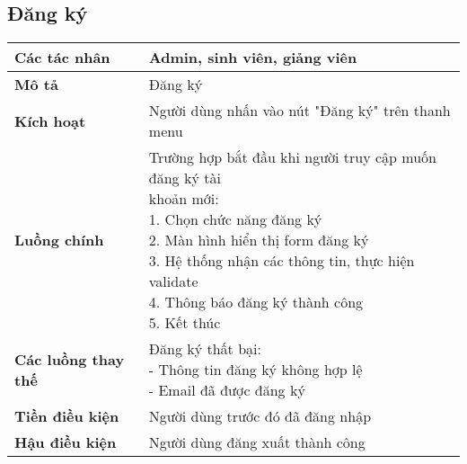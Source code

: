 \subsection*{Đăng ký}
	\begin{tabular}{|l|p{}|}
		\hline
		\textbf{Các tác nhân}       & Admin, sinh viên, giảng viên                                        \\
		\hline
		\textbf{Mô tả}              & Đăng ký                                                             \\
		\hline
		\textbf{Kích hoạt}          & Người dùng nhấn vào nút "Đăng ký" trên thanh menu                   \\
		\hline
		\textbf{Luồng chính}         & \makecell[l]{Trường hợp bắt đầu khi người truy cập muốn đăng ký tài \\khoản mới: \\ 1. Chọn chức năng đăng ký \\ 2. Màn hình hiển thị form đăng ký \\ 3. Hệ thống nhận các thông tin, thực hiện validate \\ 4. Thông báo đăng ký thành công \\ 5. Kết thúc} \\
		\hline
		\textbf{Các luồng thay thế} & \makecell[l]{Đăng ký thất bại:                                      \\ - Thông tin đăng ký không hợp lệ \\ - Email đã được đăng ký} \\
		\hline
		\textbf{Tiền điều kiện}     & Người dùng trước đó đã đăng nhập                                    \\
		\hline
		\textbf{Hậu điều kiện}      & Người dùng đăng xuất thành công                                     \\
		\hline
	\end{tabular}

